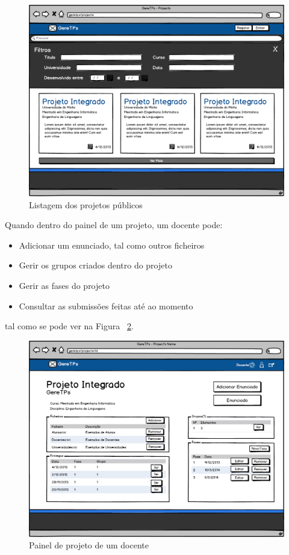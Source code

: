 \begin{figure}[htbp]
        \centering
        \includegraphics[width=1\textwidth]{images/prototipos/mockups/Projetos.png}
         \caption{Listagem dos projetos públicos}
         \label{fig: projetospublicos}
\end{figure}

Quando dentro do painel de um projeto, um docente pode:

\begin{itemize}
	\item Adicionar um enunciado, tal como outros ficheiros
	\item Gerir os grupos criados dentro do projeto
	\item Gerir as fases do projeto
	\item Consultar as submissões feitas até ao momento
\end{itemize}
tal como se pode ver na Figura ~\ref{fig: painelprojetodocente}.\\

\begin{figure}[htbp]
        \centering
        \includegraphics[width=1\textwidth]{images/prototipos/mockups/painelprojetodocente.png}
         \caption{Painel de projeto de um docente}
         \label{fig: painelprojetodocente}
\end{figure}

